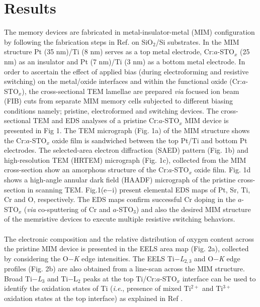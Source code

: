 \documentclass{osa-article}
\begin{document}
\section*{Results}
The memory devices are fabricated in metal-insulator-metal (MIM) configuration by following the fabrication steps in Ref.\cite{CrSTO} on SiO$_{2}$/Si substrates. In the MIM structure Pt (35 nm)/Ti (8 nm) serves as a top metal electrode, Cr:$a$-STO$_{x}$ (25 nm) as an insulator and Pt (7 nm)/Ti (3 nm) as a bottom metal electrode. In order to ascertain the effect of applied bias (during electroforming and resistive switching) on the metal/oxide interfaces and within the functional oxide (Cr:$a$-STO$_{x}$), the cross-sectional TEM lamellae are prepared \textit{via} focused ion beam (FIB) cuts from separate MIM memory cells subjected to different biasing conditions namely; pristine, electroformed and switching devices.
The cross-sectional TEM and EDS analyses of a pristine Cr:$a$-STO$_{x}$ MIM device is presented in Fig 1. The TEM micrograph (Fig. 1a) of the MIM structure shows the Cr:$a$-STO$_{x}$ oxide film is sandwiched between the top Pt/Ti and bottom Pt electrodes. The selected-area electron diffraction (SAED) pattern (Fig. 1b) and high-resolution TEM (HRTEM) micrograph (Fig. 1c), collected from the MIM cross-section show an amorphous structure of the Cr:$a$-STO$_{x}$ oxide film. Fig. 1d shows a high-angle annular dark field (HAADF) micrograph of the pristine cross-section in scanning TEM. Fig.1(e$-$i) present elemental EDS maps of Pt, Sr, Ti, Cr and O, respectively. The EDS maps confirm successful Cr doping in the $a$-STO$_{x}$ (\textit{via} co-sputtering of Cr and $a$-STO$_{3}$) and also the desired MIM structure of the memristive devices to execute multiple resistive switching behaviors. 
\paragraph*{}
The electronic composition and the relative distribution of oxygen content across the pristine MIM device is presented in the EELS area map (Fig. 2a), collected by considering the O$-$\textit{K} edge intensities. The EELS Ti$-$\textit{L}$_{2,3}$ and O$-$\textit{K} edge profiles (Fig. 2b) are also obtained from a line-scan across the MIM structure. Broad Ti$-$\textit{L}$_{3}$ and Ti$-$L$_{2}$ peaks at the top Ti/Cr:$a$-STO$_{x}$ interface can be used to identify the oxidation states of Ti (\textit{i.e}., presence of mixed Ti$^{2+}$ and Ti$^{3+}$  oxidation states at the top interface) as explained in Ref \cite{TEM}.
\end{document}
